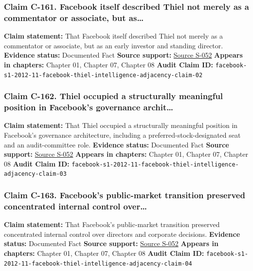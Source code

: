 \documentclass[
  american,
  11pt,
  letterpaper,
]{article}
\begin{document}
\subsubsection{Claim C-161. Facebook itself described Thiel not merely
as a commentator or associate, but
as\ldots{}}\label{claim-c-161-facebook-itself-described-thiel-not-merely-as-a-commentator-or-associate-but-as}

\textbf{Claim statement:} That Facebook itself described Thiel not
merely as a commentator or associate, but as an early investor and
standing director. \textbf{Evidence status:} Documented Fact
\textbf{Source support:}
\hyperref[source-s-052-facebook-inc-registration-statement-on-form-s-1]{Source
S-052} \textbf{Appears in chapters:} Chapter 01, Chapter 07, Chapter 08
\textbf{Audit Claim ID:}
\texttt{facebook-s1-2012-11-facebook-thiel-intelligence-adjacency-claim-02}

\subsubsection{Claim C-162. Thiel occupied a structurally meaningful
position in Facebook's governance
archit\ldots{}}\label{claim-c-162-thiel-occupied-a-structurally-meaningful-position-in-facebook-s-governance-archit}

\textbf{Claim statement:} That Thiel occupied a structurally meaningful
position in Facebook's governance architecture, including a
preferred-stock-designated seat and an audit-committee role.
\textbf{Evidence status:} Documented Fact \textbf{Source support:}
\hyperref[source-s-052-facebook-inc-registration-statement-on-form-s-1]{Source
S-052} \textbf{Appears in chapters:} Chapter 01, Chapter 07, Chapter 08
\textbf{Audit Claim ID:}
\texttt{facebook-s1-2012-11-facebook-thiel-intelligence-adjacency-claim-03}

\subsubsection{Claim C-163. Facebook's public-market transition
preserved concentrated internal control
over\ldots{}}\label{claim-c-163-facebook-s-public-market-transition-preserved-concentrated-internal-control-over}

\textbf{Claim statement:} That Facebook's public-market transition
preserved concentrated internal control over directors and corporate
decisions. \textbf{Evidence status:} Documented Fact \textbf{Source
support:}
\hyperref[source-s-052-facebook-inc-registration-statement-on-form-s-1]{Source
S-052} \textbf{Appears in chapters:} Chapter 01, Chapter 07, Chapter 08
\textbf{Audit Claim ID:}
\texttt{facebook-s1-2012-11-facebook-thiel-intelligence-adjacency-claim-04}
\end{document}
